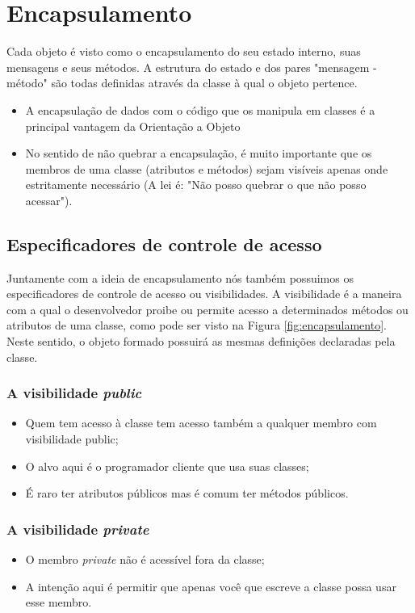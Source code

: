 \section{Encapsulamento}

Cada objeto é visto como o encapsulamento do seu estado interno, suas mensagens e seus métodos. A estrutura do estado e dos pares "mensagem - método" são todas definidas através da classe à qual o objeto pertence.

\begin{itemize}
  \item A encapsulação de dados com o código que os manipula em classes é a principal vantagem da Orientação a Objeto
  \item No sentido de não quebrar a encapsulação, é muito importante que os membros de uma classe (atributos e métodos) sejam visíveis apenas onde estritamente necessário (A lei é: "Não posso quebrar o que não posso acessar").
\end{itemize}

\subsection{Especificadores de controle de acesso}

Juntamente com a ideia de encapsulamento nós também possuimos os especificadores de controle de acesso ou visibilidades. A visibilidade é a maneira com a qual o desenvolvedor proibe ou permite acesso a determinados métodos ou atributos de uma classe, como pode ser visto na Figura \ref{fig:encapsulamento}. Neste sentido, o objeto formado possuirá as mesmas definições declaradas pela classe.

\subsubsection{A visibilidade \textit{public}}
\begin{itemize}
  \item Quem tem acesso à classe tem acesso também a qualquer membro com visibilidade public;
  \item O alvo aqui é o programador cliente que usa suas classes;
  \item É raro ter atributos públicos mas é comum ter métodos públicos.
\end{itemize}

\subsubsection{A visibilidade \textit{private}}
\begin{itemize}
  \item O membro \textit{private} não é acessível fora da classe;
  \item A intenção aqui é permitir que apenas você que escreve a classe possa usar esse membro.
\end{itemize}

